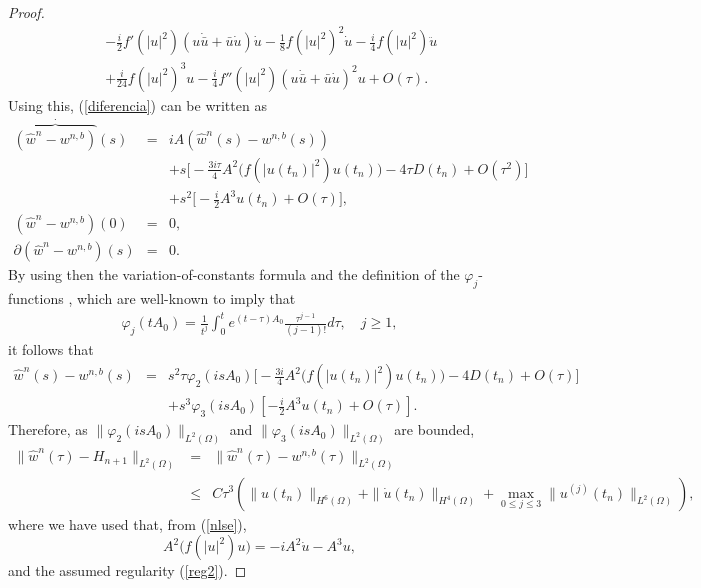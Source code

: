 \documentclass[10pt,a4paper]{amsart}
\begin{document}
\begin{proof}
\begin{eqnarray}
&&-\frac{i}{2}f'(|u|^2)(u \dot{\bar{u}}+\bar{u} \dot{u})\dot{u}-\frac{1}{8}f(|u|^2)^2 \dot{u}-\frac{i}{4}f(|u|^2) \ddot{u} \nonumber \\
&&+\frac{i}{24}f(|u|^2)^3 u -\frac{i}{4} f''(|u|^2)(u \dot{\bar{u}}+\bar{u}\dot{u})^2 u +O(\tau). \nonumber
\end{eqnarray}
Using this, (\ref{diferencia}) can be written as
\begin{eqnarray}
\stackrel{\cdot}{\overbrace{(\hat{w}^n-w^{n,b})}}(s)&=&i A (\hat{w}^n(s)-w^{n,b}(s)) \nonumber \\
&&+s \big[-\frac{3 i \tau}{4}A^2 \big( f(|u(t_n)|^2) u(t_n)\big)-4 \tau D(t_n) +O(\tau^2)\big] \nonumber \\
&&+ s^2 \big[ -\frac{i}{2} A^3 u (t_n)+O(\tau) \big], \nonumber \\
(\hat{w}^n-w^{n,b})(0)&=&0, \nonumber \\
\partial (\hat{w}^n-w^{n,b})(s)&=&0. \label{diferenciab}
\end{eqnarray}
By using then the variation-of-constants formula and the definition of the $\varphi_j$-functions \cite{HO} , which are well-known to imply that
\begin{eqnarray}
\varphi_j( t A_0)=\frac{1}{t^j} \int_0^t
e^{(t-\tau)A_0}\frac{\tau^{j-1}}{(j-1)!}d\tau, \quad j \ge 1,
\nonumber
\end{eqnarray}
it follows that
\begin{eqnarray}
\hat{w}^n(s)-w^{n,b}(s)&=&s^2 \tau \varphi_2(i s A_0)\big[-\frac{3 i}{4}A^2 \big( f(|u(t_n)|^2) u(t_n)\big)-4 D(t_n) +O(\tau)\big]
\nonumber \\
 &&+s^3  \varphi_3(i s A_0)[-\frac{i}{2} A^3 u(t_n)+O(\tau)].
\label{exprphi}
\end{eqnarray}
Therefore, as $\|\varphi_2(i s A_0)\|_{L^2(\Omega)}$ and $\|\varphi_3(i s A_0)\|_{L^2(\Omega)}$ are bounded,
\begin{eqnarray}
\|\hat{w}^n(\tau)-H_{n+1}\|_{L^2(\Omega)}&=&\|\hat{w}^n(\tau)-w^{n,b}(\tau)\|_{L^2(\Omega)} \nonumber \\
&\le& C \tau^3 (\|u(t_n)\|_{H^6(\Omega)}+\|\dot{u}(t_n)\|_{H^4(\Omega)}+\max_{0\le j \le 3} \|u^{(j)}(t_n)\|_{L^2(\Omega)}),
\nonumber
\end{eqnarray}
where we have used that, from (\ref{nlse}),
$$A^2 \big( f(|u|^2)u\big)=-i A^2 \dot{u}-A^3 u,$$
and the assumed regularity (\ref{reg2}).


\end{proof}
\end{document}
